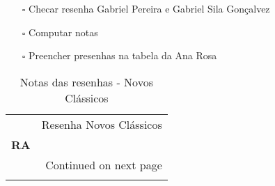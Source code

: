 \documentclass[11pt]{article}
\begin{document}
\begin{itemize}
\item[{$\square$}] Checar resenha Gabriel Pereira e Gabriel Sila Gonçalvez
\item[{$\square$}] Computar notas
\item[{$\square$}] Preencher presenhas na tabela da Ana Rosa
\end{itemize}
\begin{center}
\begin{longtable}{lr}
\caption{Notas das resenhas - Novos Clássicos}\\
\toprule
{} &  Resenha Novos Clássicos \\
\textbf{RA    } &                          \\
\midrule
\endhead
\midrule
\multicolumn{2}{r}{{Continued on next page}} \\
\midrule
\endfoot


\end{longtable}
\end{center}
\end{document}
